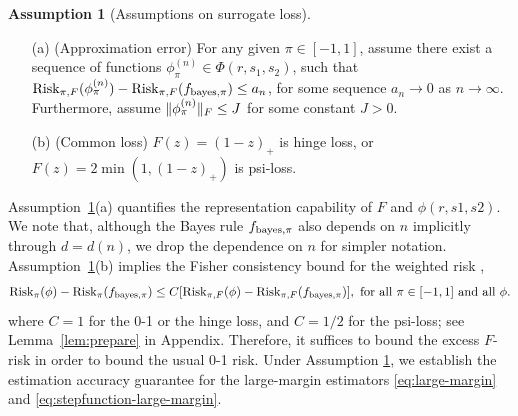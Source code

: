 \documentclass[aos]{imsart}
\theoremstyle{definition}
\newtheorem{assumption}{Assumption}
\def\risk{\textup{Risk}}
\def\bayespif{f_{\textup{bayes},\pi}}
\def\riskF{\textup{Risk}_{\pi,F}}
\begin{document}
\begin{assumption}[Assumptions on surrogate loss]\label{ass:main} \hfill
\begin{enumerate}
\item[(a)] (Approximation error) For any given $\pi\in[-1,1]$, assume there exist a sequence of functions $\phi^{(n)}_\pi\in\Phi(r,s_1,s_2)$, such that $\riskF(\phi^{(n)}_\pi)-\riskF(\bayespif)\leq a_n$, for some sequence $a_n\to 0$ as $n\to\infty$. Furthermore, assume $\lVert\phi_{\pi}^{(n)}\rVert_F \leq J$ for some constant $J>0$. 
\item[(b)] (Common loss) $F(z)=(1-z)_{+}$ is hinge loss, or $F(z)=2\min(1,(1-z)_{+})$ is psi-loss. 
\end{enumerate}
\end{assumption}

\noindent
Assumption~\ref{ass:main}(a) quantifies the representation capability of $F$ and $\phi(r, s1, s2)$. We note that, although the Bayes rule $\bayespif$ also depends on $n$ implicitly through $d=d(n)$, we drop the dependence on $n$ for simpler notation. Assumption~\ref{ass:main}(b) implies the Fisher consistency bound for the weighted risk \cite{scott2011surrogate},
\begin{equation*} \label{eq:fisher}
\risk_\pi(\phi)-\risk_\pi(\bayespif)\leq C[\riskF(\phi)-\riskF(\bayespif)], \text{ for all $\pi\in[-1,1]$ and all $\phi$}.
\end{equation*}
where $C=1$ for the 0-1 or the hinge loss, and $C=1/2$ for the psi-loss; see Lemma~\ref{lem:prepare} in Appendix. Therefore, it suffices to bound the excess $F$-risk in order to bound the usual 0-1 risk. Under Assumption \ref{ass:main}, we establish the estimation accuracy guarantee for the large-margin estimators \eqref{eq:large-margin} and \eqref{eq:stepfunction-large-margin}. 
\end{document}
